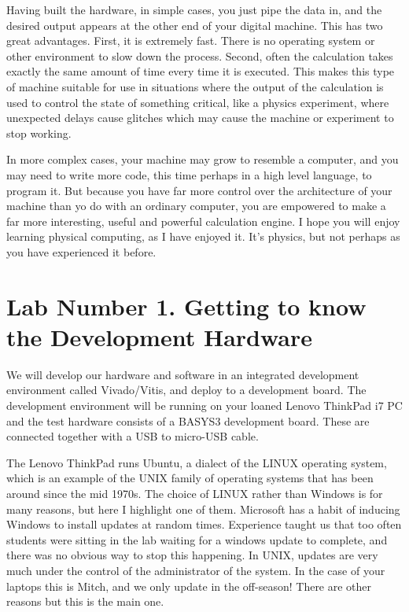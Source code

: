 \documentclass[../physical_computing.tex]{subfiles}
\begin{document}
Having built the hardware, in simple cases, you just pipe the data in, and the desired output appears at the other end of your digital machine. This has two great advantages. First, it is extremely fast. There is no operating system or other environment to slow down the process. Second, often the calculation takes exactly the same amount of time every time it is executed. This makes this type of machine suitable for use in situations where the output of the calculation is used to control the state of something critical, like a physics experiment, where unexpected delays cause glitches which may cause the machine or experiment to stop working.

In more complex cases, your machine may grow to resemble a computer, and you may need to write more code, this time perhaps in a high level language, to program it. But because you have far more control over the architecture of your machine than yo do with an ordinary computer, you are empowered to make a far more interesting, useful and powerful calculation engine. I hope you will enjoy learning physical computing, as I have enjoyed it. It's physics, but not perhaps as you have experienced it before.

\section{Lab Number 1. Getting to know the Development Hardware}
\label{sec:exploring_our_hardware}

We will develop our hardware and software in an integrated development environment called Vivado/Vitis, and deploy to a development board. The development environment will be running on your loaned Lenovo ThinkPad i7 PC and the test hardware consists of a BASYS3 development board. These are connected together with a USB to micro-USB cable. 

The Lenovo ThinkPad runs Ubuntu, a dialect of the LINUX operating system, which is an example of the UNIX family of operating systems that has been around since the mid 1970s. The choice of LINUX rather than Windows is for many reasons, but here I highlight one of them. Microsoft has a habit of inducing Windows to install updates at random times. Experience taught us that too often students were sitting in the lab waiting for a windows update to complete, and there was no obvious way to stop this happening. In UNIX, updates are very much under the control of the administrator of the system. In the case of your laptops this is Mitch, and we only update in the off-season! There are other reasons but this is the main one.
\end{document}
